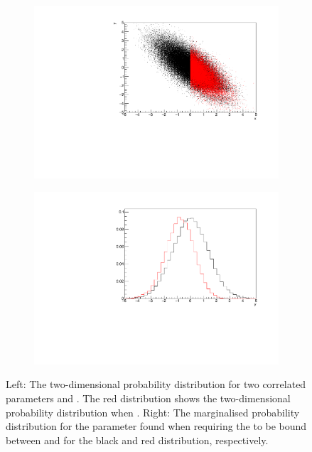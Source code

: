 \begin{figure}[h]
  \begin{subfigure}[t]{0.48\textwidth}
    \includegraphics[width=\textwidth, trim={0mm 0mm 0mm 0mm}, clip,page=1]{Figures/MCMC/MCTechnique_Marginalisation2D_Double_Correlations.pdf}
  \end{subfigure} %
    \begin{subfigure}[t]{0.48\textwidth}
    \includegraphics[width=\textwidth, trim={0mm 0mm 0mm 0mm}, clip,page=1]{Figures/MCMC/MCTechnique_Marginalisation1D_Double_Correlations.pdf}
  \end{subfigure}

  \caption{Left: The two-dimensional probability distribution for two correlated parameters  and . The red distribution shows the two-dimensional probability distribution when . Right: The marginalised probability distribution for the  parameter found when requiring the  to be bound between  and  for the black and red distribution, respectively.}
  \label{fig:MCMC_MCTechniqueMarginalisationProblems}
\end{figure}

